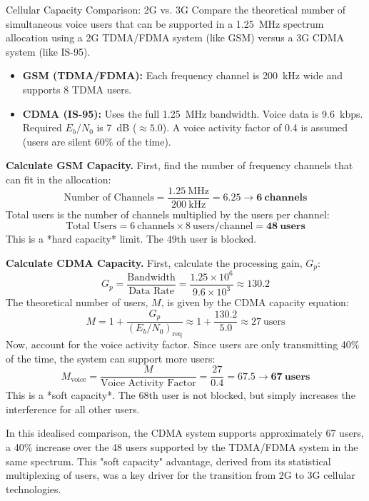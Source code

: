 \begin{workedexample}{Cellular Capacity Comparison: 2G vs. 3G}
    Compare the theoretical number of simultaneous voice users that can be supported in a 1.25~MHz spectrum allocation using a 2G TDMA/FDMA system (like GSM) versus a 3G CDMA system (like IS-95).

    \begin{itemize}
        \item \textbf{GSM (TDMA/FDMA):} Each frequency channel is 200~kHz wide and supports 8 TDMA users.
        \item \textbf{CDMA (IS-95):} Uses the full 1.25~MHz bandwidth. Voice data is 9.6~kbps. Required \(E_b/N_0\) is 7~dB (\(\approx 5.0\)). A voice activity factor of 0.4 is assumed (users are silent 60\% of the time).
    \end{itemize}

    \begin{derivationsteps}
        \step \textbf{Calculate GSM Capacity.}
        First, find the number of frequency channels that can fit in the allocation:
        \[ \text{Number of Channels} = \frac{1.25~\text{MHz}}{200~\text{kHz}} = 6.25 \to \mathbf{6~\text{channels}} \]
        Total users is the number of channels multiplied by the users per channel:
        \[ \text{Total Users} = 6~\text{channels} \times 8~\text{users/channel} = \mathbf{48~\text{users}} \]
        This is a *hard capacity* limit. The 49th user is blocked.

        \step \textbf{Calculate CDMA Capacity.}
        First, calculate the processing gain, \(G_p\):
        \[ G_p = \frac{\text{Bandwidth}}{\text{Data Rate}} = \frac{1.25 \times 10^6}{9.6 \times 10^3} \approx 130.2 \]
        The theoretical number of users, \(M\), is given by the CDMA capacity equation:
        \[ M = 1 + \frac{G_p}{(E_b/N_0)_{\text{req}}} \approx 1 + \frac{130.2}{5.0} \approx 27~\text{users} \]
        Now, account for the voice activity factor. Since users are only transmitting 40\% of the time, the system can support more users:
        \[ M_{\text{voice}} = \frac{M}{\text{Voice Activity Factor}} = \frac{27}{0.4} = 67.5 \to \mathbf{67~\text{users}} \]
        This is a *soft capacity*. The 68th user is not blocked, but simply increases the interference for all other users.
    \end{derivationsteps}

    In this idealised comparison, the CDMA system supports approximately 67 users, a 40\% increase over the 48 users supported by the TDMA/FDMA system in the same spectrum. This "soft capacity" advantage, derived from its statistical multiplexing of users, was a key driver for the transition from 2G to 3G cellular technologies.
\end{workedexample}

